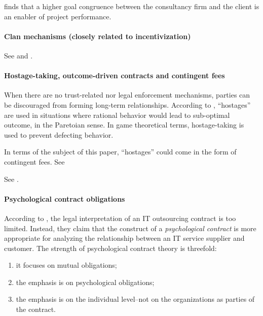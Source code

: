 \documentclass[12pt]{article}
\providecommand{\tightlist}{%
  \setlength{\itemsep}{0pt}\setlength{\parskip}{0pt}}
\begin{document}
\citet[264-266]{liberatore2010} finds that a higher goal congruence
between the consultancy firm and the client is an enabler of project
performance.

\hypertarget{clan-mechanisms-closely-related-to-incentivization}{%
\paragraph{Clan mechanisms (closely related to
incentivization)}\label{clan-mechanisms-closely-related-to-incentivization}}

See \citet[62]{aubert1996} and \citet{ouchi1980}.

\hypertarget{hostage-taking-outcome-driven-contracts-and-contingent-fees}{%
\paragraph{Hostage-taking, outcome-driven contracts and contingent
fees}\label{hostage-taking-outcome-driven-contracts-and-contingent-fees}}

When there are no trust-related nor legal enforcement mechanisms,
parties can be discouraged from forming long-term relationships.
According to \citet[47-48]{werner1993}, ``hostages'' are used in
situations where rational behavior would lead to sub-optimal outcome, in
the Paretoian sense. In game theoretical terms, hostage-taking is used
to prevent defecting behavior.

In terms of the subject of this paper, ``hostages'' could come in the
form of contingent fees. See \citep[ 243]{clark1993}

See \citet{tosi1997}.

\hypertarget{psychological-contract-obligations}{%
\paragraph{Psychological contract
obligations}\label{psychological-contract-obligations}}

According to \citet[357]{ang2004}, the legal interpretation of an IT
outsourcing contract is too limited. Instead, they claim that the
construct of a \emph{psychological contract} is more appropriate for
analyzing the relationship between an IT service supplier and customer.
The strength of psychological contract theory is threefold:

\begin{enumerate}
\def\labelenumi{\arabic{enumi}.}
\tightlist
\item
  it focuses on mutual obligations;
\item
  the emphasis is on psychological obligations;
\item
  the emphasis is on the individual level--not on the organizations as
  parties of the contract.
\end{enumerate}
\end{document}
